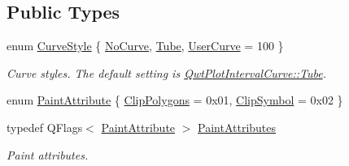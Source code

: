 \subsection*{Public Types}
\begin{DoxyCompactItemize}
\item 
enum \hyperlink{class_qwt_plot_interval_curve_aaef834575b923e1b317f4a86b2d97cd2}{Curve\-Style} \{ \hyperlink{class_qwt_plot_interval_curve_aaef834575b923e1b317f4a86b2d97cd2a40f2eb25abeed9eb2af1b4c4c0f56c15}{No\-Curve}, 
\hyperlink{class_qwt_plot_interval_curve_aaef834575b923e1b317f4a86b2d97cd2a786c87eb6dcc86d0fea802043904a647}{Tube}, 
\hyperlink{class_qwt_plot_interval_curve_aaef834575b923e1b317f4a86b2d97cd2a0ba2b869afe22c1213d7e34590775b0e}{User\-Curve} = 100
 \}
\begin{DoxyCompactList}\small\item\em Curve styles. The default setting is \hyperlink{class_qwt_plot_interval_curve_aaef834575b923e1b317f4a86b2d97cd2a786c87eb6dcc86d0fea802043904a647}{Qwt\-Plot\-Interval\-Curve\-::\-Tube}. \end{DoxyCompactList}\item 
enum \hyperlink{class_qwt_plot_interval_curve_a3deaf543802d69a38961f9e944bfad95}{Paint\-Attribute} \{ \hyperlink{class_qwt_plot_interval_curve_a3deaf543802d69a38961f9e944bfad95aac1361651d57a0df1a079f30849e72a1}{Clip\-Polygons} = 0x01, 
\hyperlink{class_qwt_plot_interval_curve_a3deaf543802d69a38961f9e944bfad95a9b164d29534731bbd3d34717baf399ca}{Clip\-Symbol} = 0x02
 \}
\item 
typedef Q\-Flags$<$ \hyperlink{class_qwt_plot_interval_curve_a3deaf543802d69a38961f9e944bfad95}{Paint\-Attribute} $>$ \hyperlink{class_qwt_plot_interval_curve_a1fa99e81e5c1b687aec620e9b8746d6c}{Paint\-Attributes}
\begin{DoxyCompactList}\small\item\em Paint attributes. \end{DoxyCompactList}\end{DoxyCompactItemize}

